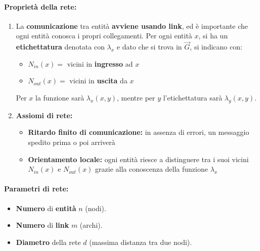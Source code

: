 \newpage

\paragraph{Proprietà della rete: }
\begin{enumerate}
	\item La \textbf{comunicazione} tra entità \textbf{avviene usando link}, ed è importante che ogni entità conosca i propri collegamenti. Per ogni entità $x$, si ha un \textbf{etichettatura} denotata con $\lambda_x$ e dato che si trova in $\vec G$, si indicano con: 
	\begin{itemize}
		\item $N_{in} (x) =$ vicini in \textbf{ingresso} ad $x$
		\item $N_{out} (x) =$ vicini in \textbf{uscita} da $x$
	\end{itemize}
	
	\begin{center}
	\end{center}
	
	Per $x$ la funzione sarà $\lambda_x (x,y)$, mentre per $y$ l'etichettatura sarà $\lambda_y (x,y)$.\\
	
	\item \textbf{Assiomi di rete: }
	\begin{itemize}
		\item \textbf{Ritardo finito di comunicazione:} in assenza di errori, un messaggio spedito prima o poi arriverà
		\item \textbf{Orientamento locale:} ogni entità riesce a distinguere tra i suoi vicini $N_{in} (x)$ e $N_{out} (x)$ grazie alla conoscenza della funzione $\lambda_x$
	\end{itemize}
	\nn
\end{enumerate}

\paragraph{Parametri di rete: }
\begin{itemize}
	\item \textbf{Numero} di \textbf{entità} $n$ (nodi).\\
	
	\item \textbf{Numero} di \textbf{link} $m$ (archi).\\
	
	\item \textbf{Diametro} della rete $d$ (massima distanza tra due nodi).\\
\end{itemize}

